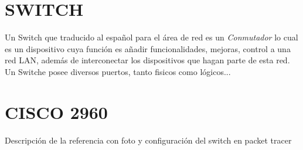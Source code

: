 \documentclass[journal]{IEEEtran}
\begin{document}
\section{SWITCH}
Un Switch que traducido al español para el área de red es un \textit{Conmutador} lo cual es un dispositivo cuya función es añadir funcionalidades, mejoras, control a una red LAN, además de interconectar los dispositivos que hagan parte de esta red.
Un Switche posee diversos puertos, tanto fisicos como lógicos...

\section{CISCO 2960}
Descripción de la referencia con foto y  configuración del switch en packet tracer
	
\end{document}
